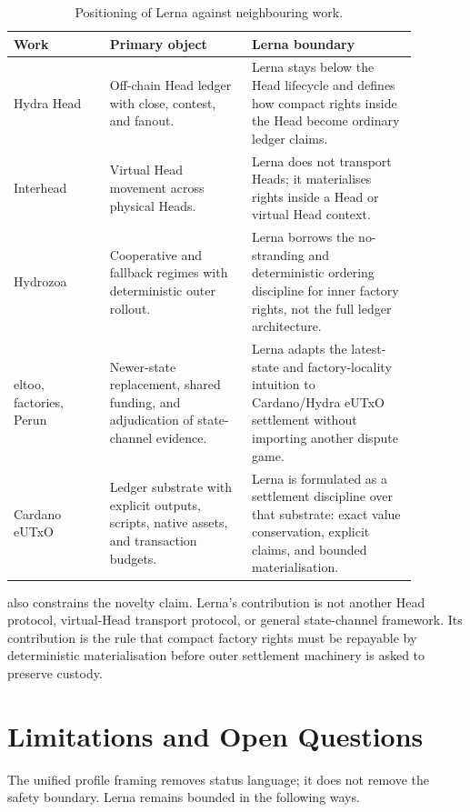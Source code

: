 \documentclass[a4paper,11pt]{article}
\theoremstyle{definition}
\theoremstyle{plain}
\theoremstyle{remark}
\begin{document}
\begin{table}[t]
\centering
\caption{Positioning of Lerna against neighbouring work.}
\label{tab:related-positioning}
\begin{tabular}{L{0.21\linewidth}L{0.31\linewidth}L{0.36\linewidth}}
\toprule
\textbf{Work} & \textbf{Primary object} & \textbf{Lerna boundary}\\
\midrule
Hydra Head~\cite{hydra-paper,hydra-docs} & Off-chain Head ledger with close,
contest, and fanout. & Lerna stays below the Head lifecycle and defines how
compact rights inside the Head become ordinary ledger claims.\\
Interhead~\cite{interhead} & Virtual Head movement across physical Heads. &
Lerna does not transport Heads; it materialises rights inside a Head or virtual
Head context.\\
Hydrozoa~\cite{hydrozoa-spec} & Cooperative and fallback regimes with
deterministic outer rollout. & Lerna borrows the no-stranding and deterministic
ordering discipline for inner factory rights, not the full ledger architecture.\\
eltoo, factories, Perun~\cite{eltoo,factories,perun} & Newer-state replacement,
shared funding, and adjudication of state-channel evidence. & Lerna adapts the
latest-state and factory-locality intuition to Cardano/Hydra eUTxO settlement
without importing another dispute game.\\
Cardano eUTxO~\cite{cardano-eutxo} & Ledger substrate with explicit outputs,
scripts, native assets, and transaction budgets. & Lerna is formulated as a
settlement discipline over that substrate: exact value conservation, explicit
claims, and bounded materialisation.\\
\bottomrule
\end{tabular}
\end{table}

 also constrains the novelty claim. Lerna's
contribution is not another Head protocol, virtual-Head transport protocol, or
general state-channel framework. Its contribution is the rule that compact
factory rights must be repayable by deterministic materialisation before outer
settlement machinery is asked to preserve custody.

\section{Limitations and Open Questions}
\label{sec:limitations}

The unified profile framing removes status language; it does not
remove the safety boundary. Lerna remains bounded in the following ways.
\end{document}
